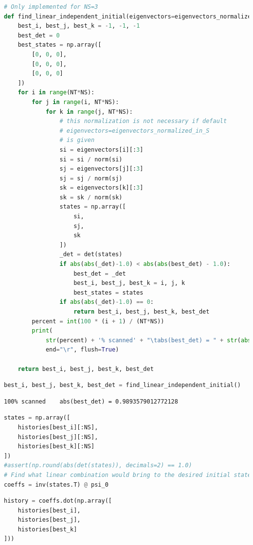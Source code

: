 \begin{lstlisting}[language=Python]
# Only implemented for NS=3
def find_linear_independent_initial(eigenvectors=eigenvectors_normalized_in_S):
    best_i, best_j, best_k = -1, -1, -1
    best_det = 0
    best_states = np.array([
        [0, 0, 0],
        [0, 0, 0],
        [0, 0, 0]
    ])
    for i in range(NT*NS):
        for j in range(i, NT*NS):
            for k in range(j, NT*NS):
                # this normalization is not necessary if default
                # eigenvectors=eigenvectors_normalized_in_S
                # is given
                si = eigenvectors[i][:3]
                si = si / norm(si)
                sj = eigenvectors[j][:3]
                sj = sj / norm(sj)
                sk = eigenvectors[k][:3]
                sk = sk / norm(sk)
                states = np.array([
                    si,
                    sj,
                    sk
                ])
                _det = det(states)
                if abs(abs(_det)-1.0) < abs(abs(best_det) - 1.0):
                    best_det = _det
                    best_i, best_j, best_k = i, j, k
                    best_states = states
                if abs(abs(_det)-1.0) == 0:
                    return best_i, best_j, best_k, best_det
        percent = int(100 * (i + 1) / (NT*NS))
        print(
            str(percent) + '% scanned' + "\tabs(best_det) = " + str(abs(best_det)),
            end="\r", flush=True)
        
    return best_i, best_j, best_k, best_det

\end{lstlisting}

\begin{lstlisting}[language=Python]
best_i, best_j, best_k, best_det = find_linear_independent_initial()
\end{lstlisting}

\begin{lstlisting}
100% scanned    abs(best_det) = 0.9893579012772128
\end{lstlisting}

\begin{lstlisting}[language=Python]
states = np.array([
    histories[best_i][:NS],
    histories[best_j][:NS],
    histories[best_k][:NS]
])
#assert(np.round(abs(det(states)), decimals=2) == 1.0)
# Find what linear combination would bring to the desired initial state psi_0_n
coeffs = inv(states.T) @ psi_0
\end{lstlisting}

\begin{lstlisting}[language=Python]
history = coeffs.dot(np.array([
    histories[best_i],
    histories[best_j],
    histories[best_k]
]))
\end{lstlisting}

